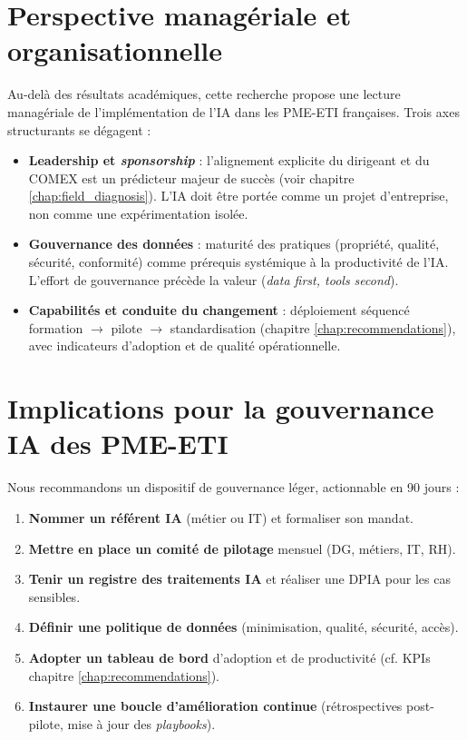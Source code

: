 \section{Perspective managériale et organisationnelle}
Au-delà des résultats académiques, cette recherche propose une lecture managériale de l’implémentation de l’IA dans les PME-ETI françaises. Trois axes structurants se dégagent :
\begin{itemize}
    \item \textbf{Leadership et \textit{sponsorship}} : l’alignement explicite du dirigeant et du COMEX est un prédicteur majeur de succès (voir chapitre \ref{chap:field_diagnosis}). L’IA doit être portée comme un projet d’entreprise, non comme une expérimentation isolée.
    \item \textbf{Gouvernance des données} : maturité des pratiques (propriété, qualité, sécurité, conformité) comme prérequis systémique à la productivité de l’IA. L’effort de gouvernance précède la valeur (\textit{data first, tools second}).
    \item \textbf{Capabilités et conduite du changement} : déploiement séquencé formation $\rightarrow$ pilote $\rightarrow$ standardisation (chapitre \ref{chap:recommendations}), avec indicateurs d’adoption et de qualité opérationnelle.
\end{itemize}

\section{Implications pour la gouvernance IA des PME-ETI}
Nous recommandons un dispositif de gouvernance léger, actionnable en 90 jours :
\begin{enumerate}
    \item \textbf{Nommer un référent IA} (métier ou IT) et formaliser son mandat.
    \item \textbf{Mettre en place un comité de pilotage} mensuel (DG, métiers, IT, RH).
    \item \textbf{Tenir un registre des traitements IA} et réaliser une DPIA pour les cas sensibles.
    \item \textbf{Définir une politique de données} (minimisation, qualité, sécurité, accès).
    \item \textbf{Adopter un tableau de bord} d’adoption et de productivité (cf. KPIs chapitre \ref{chap:recommendations}).
    \item \textbf{Instaurer une boucle d’amélioration continue} (rétrospectives post-pilote, mise à jour des \textit{playbooks}).
\end{enumerate}


